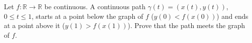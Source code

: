 Let $f:\mathbb R\to\mathbb R$ be continuous. A continuous path $\gamma(t)=(x(t),y(t))$, $0\le t\le1$, starts at a point below the graph of $f$ ($y(0)<f(x(0))$) and ends at a point above it ($y(1)>f(x(1))$). Prove that the path meets the graph of $f$.
